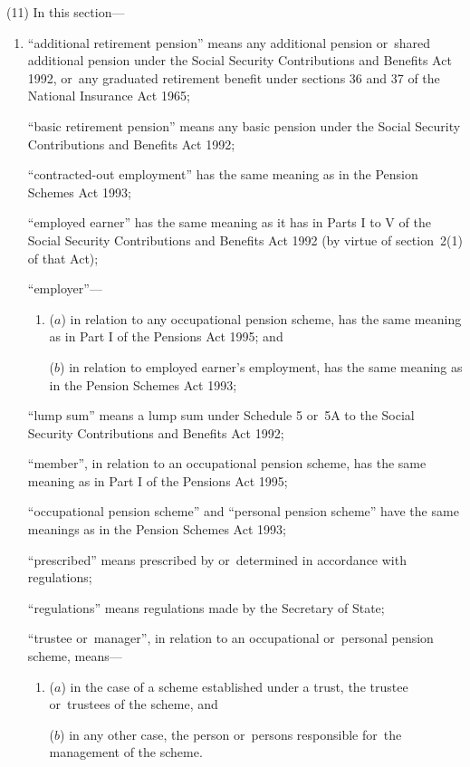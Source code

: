 \documentclass[12pt,a4paper]{article}
\begin{document}
(11) In this section—
\begin{enumerate}\item[]

“additional retirement pension” means any additional pension or~shared additional pension under the Social Security Contributions and Benefits Act 1992, or~any graduated retirement benefit under sections 36 and 37 of the National Insurance Act 1965;

“basic retirement pension” means any basic pension under the Social Security Contributions and Benefits Act 1992;

    “contracted-out employment” has the same meaning as in the Pension Schemes Act 1993;

    “employed earner” has the same meaning as it has in Parts I to V of the Social Security Contributions and Benefits Act 1992 (by virtue of section~2(1)  of that Act);

    “employer”—
\begin{enumerate}\item[]
    ($a$) 
    in relation to any occupational pension scheme, has the same meaning as in Part I of the Pensions Act 1995; and

    ($b$) 
    in relation to employed earner’s employment, has the same meaning as in the Pension Schemes Act 1993;
\end{enumerate}

“lump sum” means a lump sum under Schedule 5 or~5A to the Social Security Contributions and Benefits Act 1992;

    “member”, in relation to an occupational pension scheme, has the same meaning as in Part I of the Pensions Act 1995;

    “occupational pension scheme” and “personal pension scheme” have the same meanings as in the Pension Schemes Act 1993;

    “prescribed” means prescribed by or~determined in accordance with regulations;

    “regulations” means regulations made by the Secretary of State;


“trustee or~manager”, in relation to an occupational or~personal pension scheme, means—
\begin{enumerate}\item[]
($a$) in the case of a scheme established under a trust, the trustee or~trustees of the scheme, and

($b$) in any other case, the person or~persons responsible for~the management of the scheme.
\end{enumerate}
\end{enumerate}
\end{document}
